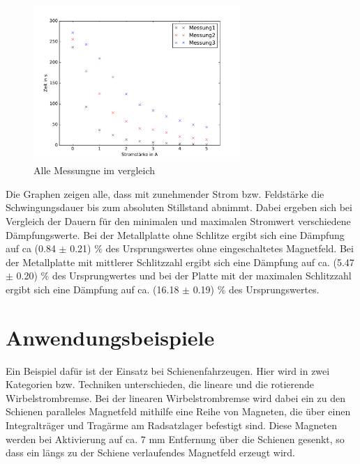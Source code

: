 \begin{figure}
  \includegraphics[width=0.7\textwidth]{Kombiniert.pdf}
  \caption{Alle Messungne im vergleich}
  \label{fig:Kombiniert}
\end{figure}

Die Graphen zeigen alle, dass mit zunehmender Strom bzw. Feldstärke die Schwingungsdauer
bis zum absoluten Stillstand abnimmt. Dabei ergeben sich bei Vergleich der Dauern
für den minimalen und maximalen Stromwert verschiedene Dämpfungswerte.
Bei der Metallplatte ohne Schlitze ergibt sich eine Dämpfung auf ca (0.84 $\pm$ 0.21)
$\%$ des Ursprungswertes ohne eingeschaltetes Magnetfeld.
Bei der Metallplatte mit mittlerer Schlitzzahl ergibt sich eine Dämpfung auf
ca. (5.47 $\pm$ 0.20) $\%$ des Ursprungwertes und bei der Platte mit der maximalen
Schlitzzahl ergibt sich eine Dämpfung auf ca. (16.18 $\pm$ 0.19) $\%$ des
Ursprungswertes.

\section{Anwendungsbeispiele}

Ein Beispiel dafür ist der Einsatz bei Schienenfahrzeugen. Hier wird in zwei
Kategorien bzw. Techniken unterschieden, die lineare und die rotierende Wirbelstrombremse.
Bei der linearen Wirbelstrombremse wird dabei ein zu den Schienen paralleles
Magnetfeld mithilfe eine Reihe von Magneten, die über einen Integralträger und
Tragärme am Radsatzlager befestigt sind. Diese Magneten werden bei Aktivierung
auf ca. 7 mm Entfernung über die Schienen gesenkt, so dass ein längs zu der Schiene
verlaufendes Magnetfeld erzeugt wird.

